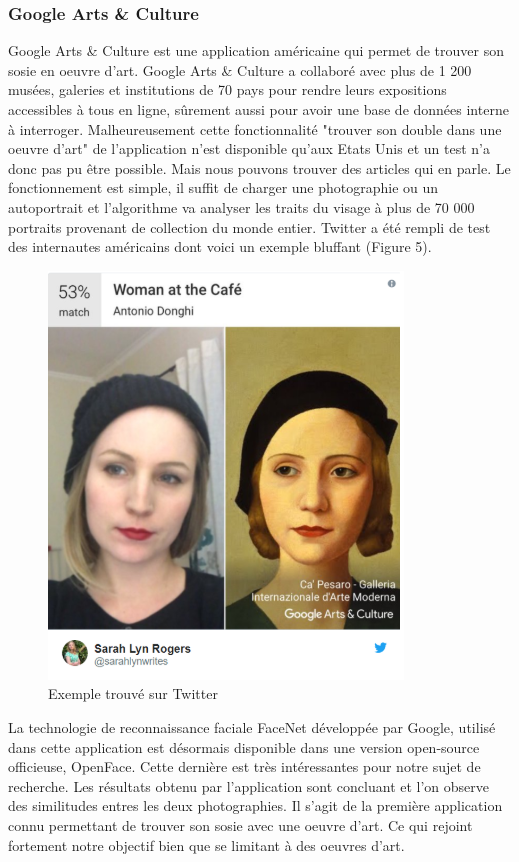 \documentclass[a4paper,12pt]{article}
\begin{document}
\subsubsection{Google Arts \& Culture}
Google Arts \& Culture est une application américaine qui permet de trouver son sosie en oeuvre d’art. Google Arts \& Culture a collaboré avec plus de 1 200 musées, galeries et institutions de 70 pays pour rendre leurs expositions accessibles à tous en ligne, sûrement aussi pour avoir une base de données interne à interroger. Malheureusement cette fonctionnalité "trouver son double dans une oeuvre d'art" de l'application n'est disponible qu'aux Etats Unis et un test n'a donc pas pu être possible. Mais nous pouvons trouver des articles qui en parle. Le fonctionnement est simple, il suffit de charger une photographie ou un autoportrait et l'algorithme va analyser les traits du visage à plus de 70 000 portraits provenant de collection du monde entier. Twitter a été rempli de test des internautes américains dont voici un exemple bluffant (Figure 5).
\begin{figure}[!h]
    \centering
        \includegraphics[scale=1]{images/GAC.PNG}
        \caption{Exemple trouvé sur Twitter}
    \end{figure}

La technologie de reconnaissance faciale FaceNet développée par Google, utilisé dans cette application est désormais disponible dans une version open-source officieuse, OpenFace. Cette dernière est très intéressantes pour notre sujet de recherche. Les résultats obtenu par l'application sont concluant et l'on observe des similitudes entres les deux photographies. Il s'agit de la première application connu permettant de trouver son sosie avec une oeuvre d'art. Ce qui rejoint fortement notre objectif bien que se limitant à des oeuvres d'art.  
\end{document}
